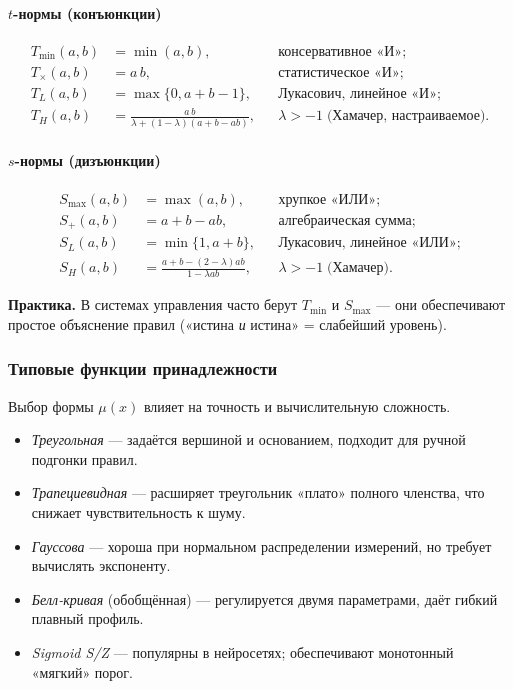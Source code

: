 \paragraph{$t$-нормы (конъюнкции)}
\begin{align}
  T_{\min}(a,b) &= \min(a,b), && \text{консервативное «И»};\\
  T_{\times}(a,b) &= a\,b,     && \text{статистическое «И»};\\
  T_{L}(a,b) &= \max\{0,a+b-1\}, && \text{Лукасович, линейное «И»};\\
  T_{H}(a,b) &= 
    \frac{a\,b}{\lambda+(1-\lambda)(a+b-ab)},
    &&\lambda>-1\;\text{(Хамачер, настраиваемое)}.
\end{align}

\paragraph{$s$-нормы (дизъюнкции)}
\begin{align}
  S_{\max}(a,b) &= \max(a,b), && \text{хрупкое «ИЛИ»};\\
  S_{+}(a,b) &= a+b-ab,       && \text{алгебраическая сумма};\\
  S_{L}(a,b) &= \min\{1,a+b\},&& \text{Лукасович, линейное «ИЛИ»};\\
  S_{H}(a,b) &=
    \frac{a+b-(2-\lambda)ab}{1-\lambda ab},
    &&\lambda>-1\;\text{(Хамачер)}.
\end{align}

\noindent
\textbf{Практика.}
В системах управления часто берут
$T_{\min}$ и $S_{\max}$ —
они обеспечивают простое объяснение правил
(«истина \emph{и} истина» = слабейший уровень).

\subsubsection{Типовые функции принадлежности}

Выбор формы $\mu(x)$ влияет на точность и вычислительную сложность.

\begin{itemize}
  \item \emph{Треугольная} —
        задаётся вершиной и основанием,
        подходит для ручной подгонки правил.
  \item \emph{Трапециевидная} —
        расширяет треугольник «плато» полного членства,
        что снижает чувствительность к шуму.
  \item \emph{Гауссова} —
        хороша при нормальном распределении измерений,
        но требует вычислять экспоненту.
  \item \emph{Белл-кривая} (обобщённая) —
        регулируется двумя параметрами,
        даёт гибкий плавный профиль.
  \item \emph{Sigmoid S/Z} —
        популярны в нейросетях;
        обеспечивают монотонный «мягкий» порог.
\end{itemize}

